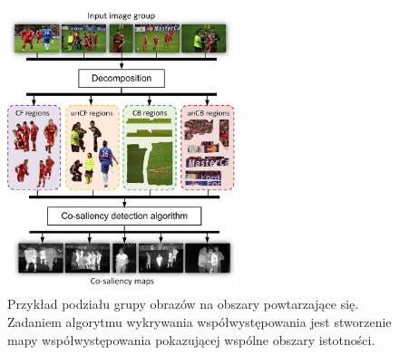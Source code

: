 \documentclass[a4paper,11pt, notitlepage, twosides, openany ]{report}
\begin{document}

	\begin{figure}[h]
		\centering
		\includegraphics[width=0.6\textwidth]{cosaliency.png}
		\caption{Przykład podziału grupy obrazów na obszary powtarzające się. Zadaniem algorytmu wykrywania współwystępowania jest stworzenie mapy współwystępowania pokazującej wspólne obszary istotności.}
		\label{co}
	\end{figure}
\end{document}
